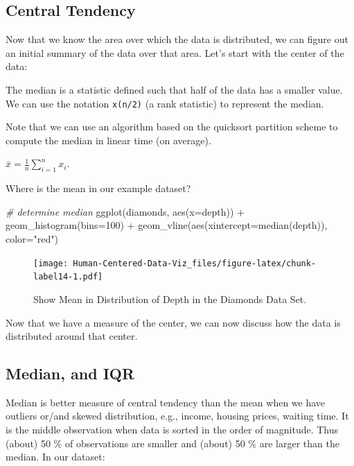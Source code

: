 \documentclass[
]{book}
\newenvironment{Shaded}{\begin{snugshade}}{\end{snugshade}}
\newcommand{\AttributeTok}[1]{\textcolor[rgb]{0.77,0.63,0.00}{#1}}
\newcommand{\CommentTok}[1]{\textcolor[rgb]{0.56,0.35,0.01}{\textit{#1}}}
\newcommand{\DecValTok}[1]{\textcolor[rgb]{0.00,0.00,0.81}{#1}}
\newcommand{\FunctionTok}[1]{\textcolor[rgb]{0.00,0.00,0.00}{#1}}
\newcommand{\NormalTok}[1]{#1}
\newcommand{\SpecialCharTok}[1]{\textcolor[rgb]{0.00,0.00,0.00}{#1}}
\newcommand{\StringTok}[1]{\textcolor[rgb]{0.31,0.60,0.02}{#1}}
\begin{document}
\hypertarget{central-tendency}{%
\subsection{Central Tendency}\label{central-tendency}}

Now that we know the area over which the data is distributed, we can figure out an initial summary of the data over that area. Let's start with the center of the data:

The median is a statistic defined such that half of the data has a smaller value. We can use the notation \texttt{x(n/2)} (a rank statistic) to represent the median.

Note that we can use an algorithm based on the quicksort partition scheme to compute the median in linear time (on average).

\(\bar{x} = \frac{1}{n}\sum_{i=1}^{n} x_{i}\).

Where is the mean in our example dataset?

\begin{Shaded}
\begin{Highlighting}[]
\CommentTok{\# determine median}
\FunctionTok{ggplot}\NormalTok{(diamonds, }\FunctionTok{aes}\NormalTok{(}\AttributeTok{x=}\NormalTok{depth)) }\SpecialCharTok{+} \FunctionTok{geom\_histogram}\NormalTok{(}\AttributeTok{bins=}\DecValTok{100}\NormalTok{) }\SpecialCharTok{+} \FunctionTok{geom\_vline}\NormalTok{(}\FunctionTok{aes}\NormalTok{(}\AttributeTok{xintercept=}\FunctionTok{median}\NormalTok{(depth)), }\AttributeTok{color=}\StringTok{"red"}\NormalTok{)}
\end{Highlighting}
\end{Shaded}

\begin{figure}
\centering
\texttt{[image: Human-Centered-Data-Viz\_files/figure-latex/chunk-label14-1.pdf]}
\caption{\label{fig:chunk-label14}Show Mean in Distribution of Depth in the Diamonds Data Set.}
\end{figure}

Now that we have a measure of the center, we can now discuss how the data is distributed around that center.

\hypertarget{median-and-iqr}{%
\subsection{Median, and IQR}\label{median-and-iqr}}

Median is better measure of central tendency than the mean when we have outliers or/and skewed distribution, e.g., income, housing prices, waiting time. It is the middle observation when data is sorted in the order of magnitude. Thus (about) 50 \% of observations are smaller and (about) 50 \% are larger than the median. In our dataset:
\end{document}
